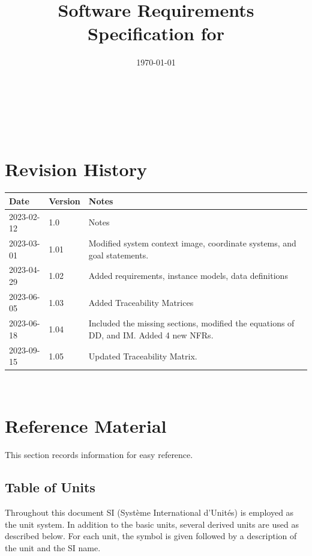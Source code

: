 \documentclass[12pt]{article}
\begin{document}
\title{Software Requirements Specification for \progname{}} 
\author{\authname}
\date{\today}
	
\maketitle

~\newpage


\tableofcontents

~\newpage

\section*{Revision History}

\begin{tabularx}{\textwidth}{p{3cm}p{2cm}X}
\toprule {\bf Date} & {\bf Version} & {\bf Notes}\\
\midrule
2023-02-12 & 1.0 & Notes\\
\midrule
2023-03-01 & 1.01 & Modified system context image, coordinate systems, and goal statements.\\
\midrule
2023-04-29 & 1.02 & Added requirements, instance models, data definitions\\
\midrule
2023-06-05 & 1.03 & Added Traceability Matrices \\
\midrule
2023-06-18 & 1.04 & Included the missing sections, modified the equations of DD, and IM. Added 4 new NFRs.\\
\midrule
2023-09-15 & 1.05 & Updated Traceability Matrix.\\
\bottomrule
\end{tabularx}

~\newpage

\section{Reference Material}

This section records information for easy reference.

\subsection{Table of Units}

Throughout this document SI (Syst\`{e}me International d'Unit\'{e}s) is employed
as the unit system.  In addition to the basic units, several derived units are
used as described below.  For each unit, the symbol is given followed by a
description of the unit and the SI name.
\end{document}
